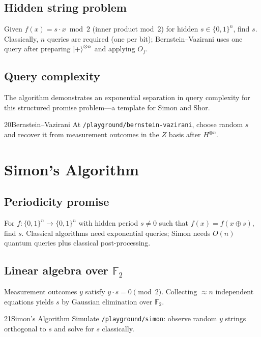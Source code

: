 \subsection{Hidden string problem}

Given $f(x)=s\cdot x \bmod 2$ (inner product mod~2) for hidden $s\in\{0,1\}^n$, find $s$. Classically, $n$ queries are required (one per bit); Bernstein--Vazirani uses one query after preparing $\ket{+}^{\otimes n}$ and applying $O_f$.

\subsection{Query complexity}

The algorithm demonstrates an exponential separation in query complexity for this structured promise problem---a template for Simon and Shor.

\begin{labbox}{20}{Bernstein--Vazirani}
At \texttt{/playground/bernstein-vazirani}, choose random $s$ and recover it from measurement outcomes in the $Z$ basis after $H^{\otimes n}$.
\end{labbox}

\section{Simon's Algorithm}
\label{sec:simon}

\subsection{Periodicity promise}

For $f:\{0,1\}^n\to\{0,1\}^n$ with hidden period $s\neq 0$ such that $f(x)=f(x\oplus s)$, find $s$. Classical algorithms need exponential queries; Simon needs $O(n)$ quantum queries plus classical post-processing.

\subsection{Linear algebra over $\mathbb{F}_2$}

Measurement outcomes $y$ satisfy $y\cdot s = 0 \pmod 2$. Collecting $\approx n$ independent equations yields $s$ by Gaussian elimination over $\mathbb{F}_2$.

\begin{labbox}{21}{Simon's Algorithm}
Simulate \texttt{/playground/simon}: observe random $y$ strings orthogonal to $s$ and solve for $s$ classically.
\end{labbox}

